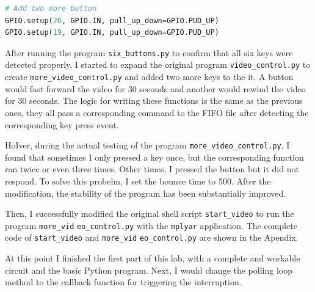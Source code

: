 \documentclass[12pt]{report}
\newcommand{\code}[1]{\colorbox{light-gray}{\texttt{#1}}}
\begin{document}
\begin{center}
\begin{lstlisting}[language=Python, caption= Setup codes for two more button, label=code:code1] 
# Add two more button 
GPIO.setup(26, GPIO.IN, pull_up_down=GPIO.PUD_UP)
GPIO.setup(19, GPIO.IN, pull_up_down=GPIO.PUD_UP)
\end{lstlisting}
\end{center}\vspace{-2em}
After running the program \code{six\_buttons.py} to confirm that all six keys were detected properly, I started to expand the original program \code{video\_control.py} to create \code{more\_video\_control.py} and added two more keys to the it. A button would fast forward the video for 30 seconds and another would rewind the video for 30 seconds. The logic for writing these functions is the same as the previous ones, they all pass a corresponding command to the FIFO file after detecting the corresponding key press event.\par
HoIver, during the actual testing of the program \code{more\_video\_control.py}, I found that sometimes I only pressed a key once, but the corresponding function ran twice or even three times. Other times, I pressed the button but it did not respond. To solve this probelm, I set the bounce time to 500. After the modification, the stability of the program has been substantially improved.\par
Then, I successfully modified the original shell script \code{start\_video} to run the program \code{more\_vid} \code{eo\_control.py} with the \code{mplyar} application. The complete code of \code{start\_video} and  \code{more\_vid} \code{eo\_control.py} are shown in the Apendix.\par
At this point I finished the first part of this lab, with a complete and workable circuit and the basic Python program. Next, I would change the polling loop method to the callback function for triggering the interruption.\vspace{-1em}
\end{document}
